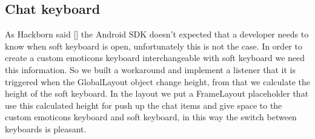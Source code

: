 \subsection{Chat keyboard}
As Hackborn said [] the Android SDK doesn’t expected that a developer needs to know when soft keyboard is open, unfortunately this is not the case. In order to create a custom emoticons keyboard interchangeable with soft keyboard we need this information. So we built a workaround and implement a listener that it is triggered when the GlobalLayout object change height, from that we calculate the height of the soft keyboard. In the layout we put a FrameLayout placeholder that use this calculated height for push up the chat items and give space to the custom emoticons keyboard and soft keyboard, in this way the switch between keyboards is pleasant.
